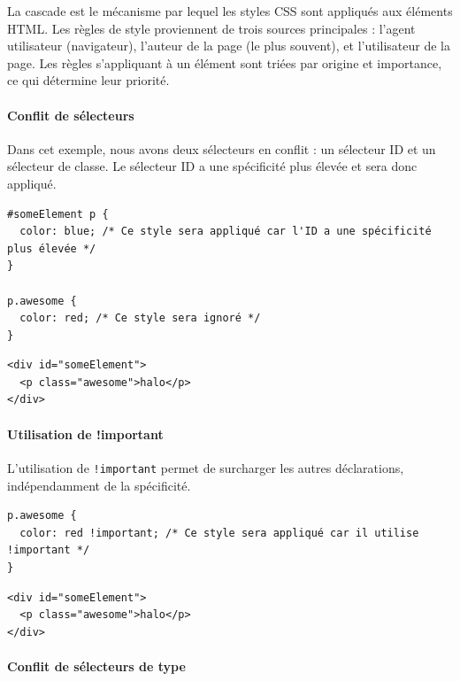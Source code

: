 \documentclass{report}
\begin{document}
\begin{multicols*}{2}
La cascade est le mécanisme par lequel les styles CSS sont appliqués aux éléments HTML. Les règles de style proviennent de trois sources principales : l'agent utilisateur (navigateur), l'auteur de la page (le plus souvent), et l'utilisateur de la page. Les règles s'appliquant à un élément sont triées par origine et importance, ce qui détermine leur priorité.


\paragraph{Conflit de sélecteurs}

Dans cet exemple, nous avons deux sélecteurs en conflit : un sélecteur ID et un sélecteur de classe. Le sélecteur ID a une spécificité plus élevée et sera donc appliqué.

\begin{lstlisting}[style=CSSDraculaLight]
#someElement p {
  color: blue; /* Ce style sera appliqué car l'ID a une spécificité plus élevée */
}

p.awesome {
  color: red; /* Ce style sera ignoré */
}
\end{lstlisting}

\begin{lstlisting}[style=HTMLDraculaDark]
<div id="someElement">
  <p class="awesome">halo</p>
</div>
\end{lstlisting}

\paragraph{Utilisation de !important}

L'utilisation de \texttt{!important} permet de surcharger les autres déclarations, indépendamment de la spécificité.

\begin{lstlisting}[style=CSSDraculaLight]
p.awesome {
  color: red !important; /* Ce style sera appliqué car il utilise !important */
}
\end{lstlisting}

\begin{lstlisting}[style=HTMLDraculaDark]
<div id="someElement">
  <p class="awesome">halo</p>
</div>
\end{lstlisting}

\paragraph{Conflit de sélecteurs de type}


\end{multicols*}
\end{document}
